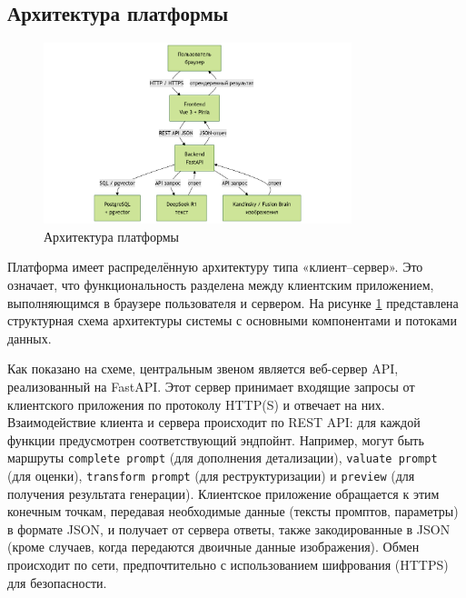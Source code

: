 \subsection{Архитектура платформы}
\begin{figure}[htbp]
    \centering
    \includegraphics[width=0.8\textwidth]{picture/app-architecture.png}
    \caption{Архитектура платформы}\label{architecture}
\end{figure}
 Платформа имеет распределённую архитектуру типа «клиент–сервер». Это означает, что функциональность разделена между клиентским приложением, выполняющимся в браузере пользователя и сервером. На рисунке \ref{architecture} представлена структурная схема архитектуры системы с основными компонентами и потоками данных.

Как показано на схеме, центральным звеном является веб-сервер API, реализованный на FastAPI. Этот сервер принимает входящие запросы от клиентского приложения по протоколу HTTP(S) и отвечает на них. Взаимодействие клиента и сервера происходит по REST API: для каждой функции предусмотрен соответствующий эндпойнт. Например, могут быть маршруты \verb|complete prompt| (для дополнения детализации), \verb|valuate prompt| (для оценки), \verb|transform prompt| (для реструктуризации) и \verb|preview| (для получения результата генерации). Клиентское приложение обращается к этим конечным точкам, передавая необходимые данные (тексты промптов, параметры) в формате JSON, и получает от сервера ответы, также закодированные в JSON (кроме случаев, когда передаются двоичные данные изображения). Обмен происходит по сети, предпочтительно с использованием шифрования (HTTPS) для безопасности.


